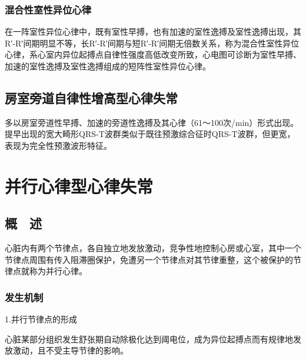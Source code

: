 \protect\hypertarget{text00022.htmlux5cux23subid274}{}{}

\subsection{混合性室性异位心律}

在一阵室性异位心律中，既有室性早搏，也有加速的室性逸搏及室性逸搏出现，其R′-R′间期明显不等，长R′-R′间期与短R′-R′间期无倍数关系，称为混合性室性异位心律，系心室内异位起搏点自律性强度高低改变所致，心电图可诊断为室性早搏、加速的室性逸搏及室性逸搏组成的短阵性室性异位心律。

\protect\hypertarget{text00022.htmlux5cux23subid275}{}{}

\section{房室旁道自律性增高型心律失常}

多以房室旁道性早搏、加速的旁道性逸搏及其心律（61～100次/min）形式出现。提早出现的宽大畸形QRS-T波群类似于既往预激综合征时QRS-T波群，但更宽，表现为完全性预激波形特征。

\protect\hypertarget{text00023.html}{}{}

\protect\hypertarget{text00023.htmlux5cux23chapter23}{}{}

\chapter{并行心律型心律失常}

\protect\hypertarget{text00023.htmlux5cux23subid276}{}{}

\section{概　述}

心脏内有两个节律点，各自独立地发放激动，竞争性地控制心房或心室，其中一个节律点周围有传入阻滞圈保护，免遭另一个节律点对其节律重整，这个被保护的节律点就称为并行心律。

\protect\hypertarget{text00023.htmlux5cux23subid277}{}{}

\subsection{发生机制}

1.并行节律点的形成

心脏某部分组织发生舒张期自动除极化达到阈电位，成为异位起搏点而有规律地发放激动，且不受主导节律的影响。

